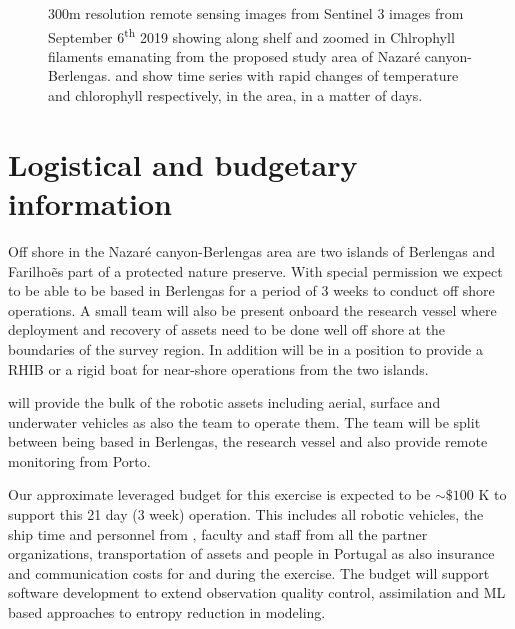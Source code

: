 \begin{figure}[!h]
  \caption{300m resolution remote sensing images from Sentinel 3
    images from September 6\textsuperscript{th} 2019 showing along
    shelf  and zoomed in Chlrophyll filaments
     emanating from the proposed study area of
    Nazar\'e canyon-Berlengas.  and
     show time series with rapid changes of
    temperature and chlorophyll respectively, in the area, in a matter
    of days.}
  \label{fig:studyarea-2}
\end{figure}

\section*{Logistical and budgetary information}

Off shore in the Nazar\'e canyon-Berlengas area are two islands of
Berlengas and Farilho\~es part of a protected nature preserve. With
special permission we expect to be able to be based in Berlengas for a
period of 3 weeks to conduct off shore operations. A small team will
also be present onboard the \inst research vessel where deployment and
recovery of assets need to be done well off shore at the boundaries of
the survey region. In addition \inst will be in a position to provide
a RHIB or a rigid boat for near-shore operations from the two
islands.

\univ will provide the bulk of the robotic assets including
aerial, surface and underwater vehicles as also the team to operate
them. The team will be split between being based in Berlengas, the
research vessel and also provide remote monitoring from Porto.

Our approximate leveraged budget for this exercise is expected to be
$\sim \$100$ K to support this 21 day (3 week) operation. This
includes all robotic vehicles, the ship time and personnel from
\inste, faculty and staff from all the partner organizations,
transportation of assets and people in Portugal as also insurance and
communication costs for and during the exercise. The budget will
support software development to extend observation quality control,
assimilation and ML based approaches to entropy reduction in modeling.


